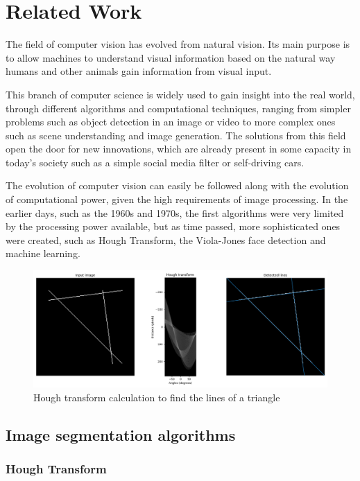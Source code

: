 \chapter{Related Work}
\label{chap:related}

\par The field of computer vision has evolved from natural vision. Its main purpose is to allow machines to understand visual information based on the natural way humans and other animals gain information from visual input.
\par This branch of computer science is widely used to gain insight into the real world, through different algorithms and computational techniques, ranging from simpler problems such as object detection in an image or video to more complex ones such as scene understanding and image generation. The solutions from this field open the door for new innovations, which are already present in some capacity in today's society such as a simple social media filter or self-driving cars.
\par The evolution of computer vision can easily be followed along with the evolution of computational power, given the high requirements of image processing. In the earlier days, such as the 1960s and 1970s, the first algorithms were very limited by the processing power available, but as time passed, more sophisticated ones were created, such as Hough Transform, the Viola-Jones face detection and machine learning.

\begin{figure}
    \centering
    \includegraphics[width=0.5\linewidth]{figures/HoughTransform.png}
    \caption{Hough transform calculation to find the lines of a triangle \cite{hough}}
    \label{fig:houghl}
\end{figure}

\section{Image segmentation algorithms}
\label{sec:relatedsec1}

\subsection{Hough Transform}
\label{subsec:relatedsec1subsec1}

